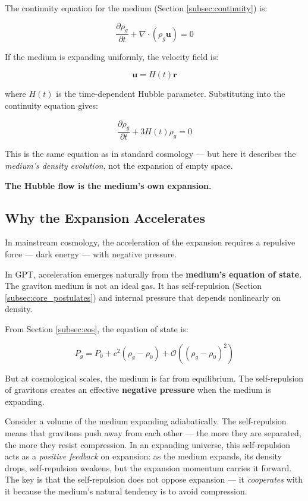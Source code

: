 \documentclass[12pt, a4paper]{article}
\begin{document}
The continuity equation for the medium (Section \ref{subsec:continuity}) is:

\[
\frac{\partial \rho_g}{\partial t} + \nabla \cdot (\rho_g \mathbf{u}) = 0
\]

If the medium is expanding uniformly, the velocity field is:

\[
\mathbf{u} = H(t) \mathbf{r}
\]

where \( H(t) \) is the time-dependent Hubble parameter. Substituting into the continuity equation gives:

\[
\frac{\partial \rho_g}{\partial t} + 3H(t) \rho_g = 0
\]

This is the same equation as in standard cosmology — but here it describes the \textit{medium's density evolution}, not the expansion of empty space.

\textbf{The Hubble flow is the medium's own expansion.}

\subsection{Why the Expansion Accelerates}
\label{subsec:expansion_accelerates}

In mainstream cosmology, the acceleration of the expansion requires a repulsive force — dark energy — with negative pressure.

In GPT, acceleration emerges naturally from the \textbf{medium's equation of state}. The graviton medium is not an ideal gas. It has self-repulsion (Section \ref{subsec:core_postulates}) and internal pressure that depends nonlinearly on density.

From Section \ref{subsec:eos}, the equation of state is:

\[
P_g = P_0 + c^2 (\rho_g - \rho_0) + \mathcal{O}((\rho_g - \rho_0)^2)
\]

But at cosmological scales, the medium is far from equilibrium. The self-repulsion of gravitons creates an effective \textbf{negative pressure} when the medium is expanding.

Consider a volume of the medium expanding adiabatically. The self-repulsion means that gravitons push away from each other — the more they are separated, the more they resist compression. In an expanding universe, this self-repulsion acts as a \textit{positive feedback} on expansion: as the medium expands, its density drops, self-repulsion weakens, but the expansion momentum carries it forward. The key is that the self-repulsion does not oppose expansion — it \textit{cooperates} with it because the medium's natural tendency is to avoid compression.
\end{document}
